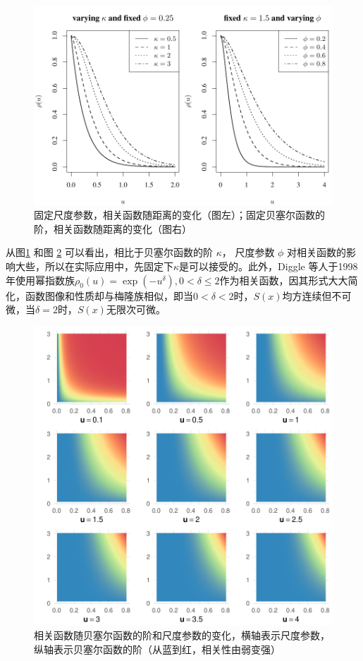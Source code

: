 \documentclass[hyperref, a4paper, UTF8, zihao = -4, linespread = 1.25, scheme = chinese]{ctexbook}
\begin{document}
\begin{figure}

{\centering \includegraphics[width=0.7\linewidth]{figures/matern} 

}

\caption{固定尺度参数，相关函数随距离的变化（图左）；固定贝塞尔函数的阶，相关函数随距离的变化（图右）}\label{fig:matern-2d}
\end{figure}

从图\ref{fig:matern-2d} 和图 \ref{fig:matern-3d}
可以看出，相比于贝塞尔函数的阶 \(\kappa\)， 尺度参数 \(\phi\)
对相关函数的影响大些，所以在实际应用中，先固定下\(\kappa\)是可以接受的。此外，Diggle
等人于1998年使用幂指数族\(\rho_{0}(u)=\exp(-u^{\delta}), 0 < \delta \leq 2\)作为相关函数\citep{Diggle1998}，因其形式大大简化，函数图像和性质却与梅隆族相似，即当\(0<\delta<2\)时，\(S(x)\)均方连续但不可微，当\(\delta=2\)时，\(S(x)\)无限次可微。

\begin{figure}

{\centering \includegraphics[width=0.7\linewidth]{figures/matern-3d} 

}

\caption{相关函数随贝塞尔函数的阶和尺度参数的变化，横轴表示尺度参数，纵轴表示贝塞尔函数的阶（从蓝到红，相关性由弱变强）}\label{fig:matern-3d}
\end{figure}
\end{document}
